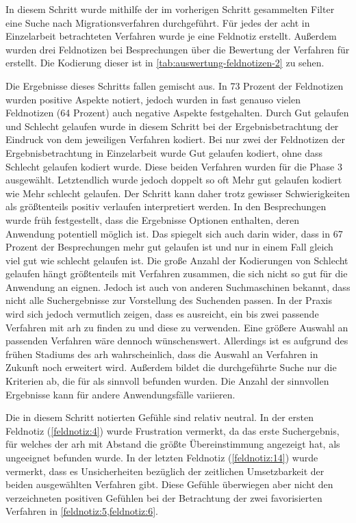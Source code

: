 In diesem Schritt wurde mithilfe der im vorherigen Schritt gesammelten Filter eine Suche nach Migrationsverfahren durchgeführt.
Für jedes der acht in Einzelarbeit betrachteten Verfahren wurde je eine Feldnotiz erstellt.
Außerdem wurden drei Feldnotizen bei Besprechungen über die Bewertung der Verfahren für \jf erstellt.
Die Kodierung dieser ist in \cref{tab:auswertung-feldnotizen-2} zu sehen.



Die Ergebnisse dieses Schritts fallen gemischt aus.
In 73 Prozent der Feldnotizen wurden positive Aspekte notiert, jedoch wurden in fast genauso vielen Feldnotizen (64 Prozent) auch negative Aspekte festgehalten.
Durch \glqq Gut gelaufen\grqq{} und \glqq Schlecht gelaufen\grqq{} wurde in diesem Schritt bei der Ergebnisbetrachtung der Eindruck von dem jeweiligen Verfahren kodiert.
Bei nur zwei der Feldnotizen der Ergebnisbetrachtung in Einzelarbeit wurde \glqq Gut gelaufen\grqq{} kodiert, ohne dass \glqq Schlecht gelaufen\grqq{} kodiert wurde.
Diese beiden Verfahren wurden für die Phase 3 ausgewählt.
Letztendlich wurde jedoch doppelt so oft \glqq Mehr gut gelaufen\grqq{} kodiert wie \glqq Mehr schlecht gelaufen\grqq{}.
Der Schritt kann daher trotz gewisser Schwierigkeiten als größtenteils positiv verlaufen interpretiert werden.
In den Besprechungen wurde früh festgestellt, dass die Ergebnisse Optionen enthalten, deren Anwendung potentiell möglich ist.
Das spiegelt sich auch darin wider, dass in 67 Prozent der Besprechungen mehr gut gelaufen ist und nur in einem Fall gleich viel gut wie schlecht gelaufen ist.
Die große Anzahl der Kodierungen von \glqq Schlecht gelaufen\grqq{} hängt größtenteils mit Verfahren zusammen, die sich nicht so gut für die Anwendung an \jf eignen.
Jedoch ist auch von anderen Suchmaschinen bekannt, dass nicht alle Suchergebnisse zur Vorstellung des Suchenden passen.
In der Praxis wird sich jedoch vermutlich zeigen, dass es ausreicht, ein bis zwei passende Verfahren mit \gls{arh} zu finden zu und diese zu verwenden.
Eine größere Auswahl an passenden Verfahren wäre dennoch wünschenswert.
Allerdings ist es aufgrund des frühen Stadiums des \gls{arh} wahrscheinlich, dass die Auswahl an Verfahren in Zukunft noch erweitert wird.
Außerdem bildet die durchgeführte Suche nur die Kriterien ab, die für \jf als sinnvoll befunden wurden.
Die Anzahl der sinnvollen Ergebnisse kann für andere Anwendungsfälle variieren.

Die in diesem Schritt notierten Gefühle sind relativ neutral.
In der ersten Feldnotiz (\cref{feldnotiz:4}) wurde Frustration vermerkt, da das erste Suchergebnis, für welches der \gls{arh} mit Abstand die größte Übereinstimmung angezeigt hat, als ungeeignet befunden wurde.
In der letzten Feldnotiz (\cref{feldnotiz:14}) wurde vermerkt, dass es Unsicherheiten bezüglich der zeitlichen Umsetzbarkeit der beiden ausgewählten Verfahren gibt.
Diese Gefühle überwiegen aber nicht den verzeichneten positiven Gefühlen bei der Betrachtung der zwei favorisierten Verfahren in \cref{feldnotiz:5,feldnotiz:6}.

